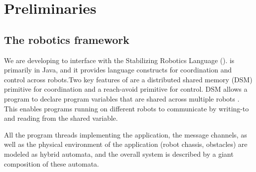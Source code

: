 \section{Preliminaries}
\label{sect:Prelim}



\subsection{The \StarL robotics framework}
We are developing \rolang to interface with the Stabilizing Robotics Language (\StarL). 
\StarL is primarily in Java, and it provides language constructs for coordination and control
across robots.Two key features of \StarL are a distributed shared memory (DSM) primitive
for coordination and a reach-avoid primitive for control. DSM allows a
program to declare program variables that are shared across multiple robots
. This enables programs running on different
robots to communicate by writing-to and reading from the shared variable.

All the program threads implementing the application, the message channels,
as well as the physical environment of the application (robot chassis, obstacles)
are modeled as hybrid automata, and the overall system is described
by a giant composition of these automata. 